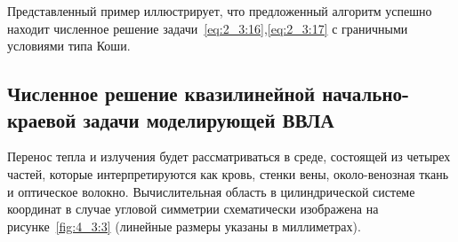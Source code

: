Представленный пример иллюстрирует, что предложенный
алгоритм успешно находит численное решение
задачи~\eqref{eq:2_3:16},\eqref{eq:2_3:17} с граничными
условиями типа Коши.



\subsection{Численное решение квазилинейной начально-краевой задачи моделирующей ВВЛА}
\label{subsec:ch4/sec3/quasilinear}
Перенос тепла и излучения будет рассматриваться в среде,
состоящей из четырех частей, которые интерпретируются как кровь,
стенки вены, около-венозная ткань и оптическое волокно.
Вычислительная область в цилиндрической системе координат в случае
угловой симметрии схематически изображена на рисунке~\ref{fig:4_3:3}
(линейные размеры указаны в миллиметрах).

